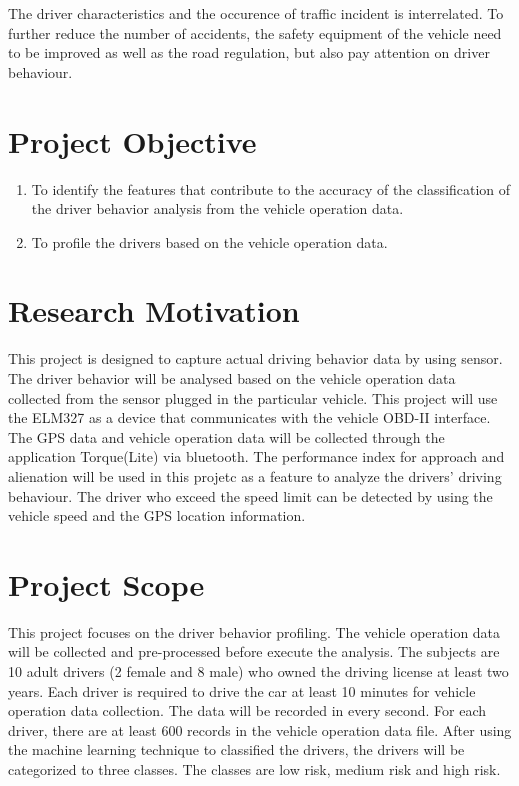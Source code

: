 The driver characteristics and the occurence of traffic incident is interrelated. To further reduce the number of accidents, the safety equipment of the vehicle need to be improved as well as the road regulation, but also pay attention on driver behaviour. 

\section{Project Objective}
\begin{enumerate}
\item To identify the features that contribute to the accuracy of the classification of the driver behavior analysis from the vehicle operation data.
\item To profile the drivers based on the vehicle operation data. 
\end{enumerate}

\section{Research Motivation}
This project is designed to capture actual driving behavior data by using sensor. The driver behavior will be analysed based on the vehicle operation data collected from the sensor plugged in the particular vehicle.  
This project will use the ELM327 as a device that communicates with the vehicle OBD-II interface. The GPS data and vehicle operation data will be collected through the application Torque(Lite) via bluetooth. 
The performance index for approach and alienation will be used in this projetc as a feature to analyze the drivers' driving behaviour. The driver who exceed the speed limit can be detected by using the vehicle speed and the GPS location information.

\section{Project Scope}
This project focuses on the driver behavior profiling. The vehicle operation data will be collected and pre-processed before execute the analysis. The subjects are 10 adult drivers (2 female and 8 male) who owned the driving license at least two years. Each driver is required to drive the car at least 10 minutes for vehicle operation data collection. The data will be recorded in every second. For each driver, there are at least 600 records in the vehicle operation data file. After using the machine learning technique to classified the drivers, the drivers will be categorized to three classes. The classes are low risk, medium risk and high risk. 
 
